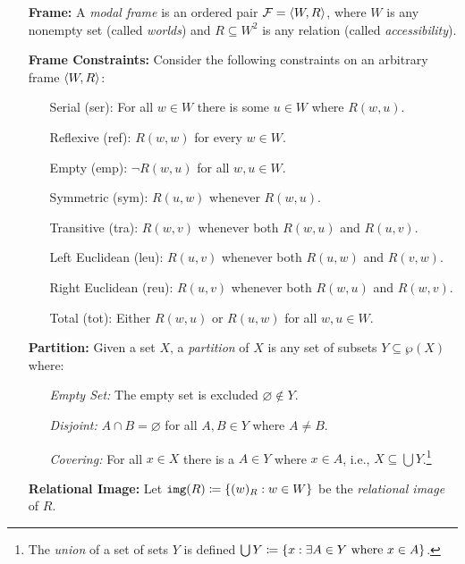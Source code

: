 \documentclass[a4paper, 11pt]{article} %
\begin{document}
\begin{enumerate}[leftmargin=1.2in] %
  \item[\bf Frame:] A \textit{modal frame} is an ordered pair $\mathcal{F} = \langle W,R\rangle$, where $W$ is any nonempty set (called \textit{worlds}) and $R \subseteq W^2$ is any relation (called \textit{accessibility}).
  \item[\bf Frame Constraints:]
    Consider the following constraints on an arbitrary frame $\langle W, R\rangle$:
    \begin{itemize}
      \item[\sc Serial (ser):] For all $w \in W$ there is some $u \in W$ where $R(w,u)$.
      \item[\sc Reflexive (ref):] $R(w,w)$ for every $w\in W$.
      \item[\sc Empty (emp):] $\neg R(w,u)$ for all $w, u\in W$.
      \item[\sc Symmetric (sym):] $R(u,w)$ whenever $R(w,u)$. 
      \item[\sc Transitive (tra):] $R(w,v)$ whenever both $R(w,u)$ and $R(u,v)$. 
      \item[\sc Left Euclidean (leu):] $R(u,v)$ whenever both $R(u,w)$ and $R(v,w)$. 
      \item[\sc Right Euclidean (reu):] $R(u,v)$ whenever both $R(w,u)$ and $R(w,v)$. 
      \item[\sc Total (tot):] Either $R(w,u)$ or $R(u,w)$ for all $w,u \in W$. 
    \end{itemize}
  \item[\bf Partition:] Given a set $X$, a \textit{partition} of $X$ is any set of subsets $Y \subseteq \wp(X)$ where:
    \begin{itemize}
      \item[\it Empty Set:] The empty set is excluded $\varnothing \notin Y$.
      \item[\it Disjoint:] $A \cap B = \varnothing$ for all $A, B \in Y$ where $A \neq B$. 
      \item[\it Covering:] For all $x \in X$ there is a $A \in Y$ where $x \in A$, i.e., $X \subseteq \bigcup Y$.\footnote{The \textit{union} of a set of sets $Y$ is defined $\bigcup Y \coloneq \lbrace x : \exists A \in Y \text{ where } x \in A\rbrace$.}
    \end{itemize}
  \item[\bf Relational Image:] Let $\mathtt{img}(R) \coloneq \lbrace(w)_R : w \in W\rbrace$ be the \textit{relational image} of $R$.
\end{enumerate}
\end{document}
